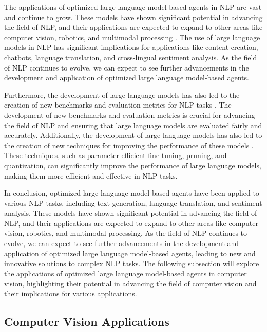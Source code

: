 \documentclass[11pt]{article}
\begin{document}
The applications of optimized large language model-based agents in NLP are vast and continue to grow. These models have shown significant potential in advancing the field of NLP, and their applications are expected to expand to other areas like computer vision, robotics, and multimodal processing \cite{ref227}. The use of large language models in NLP has significant implications for applications like content creation, chatbots, language translation, and cross-lingual sentiment analysis. As the field of NLP continues to evolve, we can expect to see further advancements in the development and application of optimized large language model-based agents.

Furthermore, the development of large language models has also led to the creation of new benchmarks and evaluation metrics for NLP tasks \cite{ref31}. The development of new benchmarks and evaluation metrics is crucial for advancing the field of NLP and ensuring that large language models are evaluated fairly and accurately. Additionally, the development of large language models has also led to the creation of new techniques for improving the performance of these models \cite{ref228}. These techniques, such as parameter-efficient fine-tuning, pruning, and quantization, can significantly improve the performance of large language models, making them more efficient and effective in NLP tasks.

In conclusion, optimized large language model-based agents have been applied to various NLP tasks, including text generation, language translation, and sentiment analysis. These models have shown significant potential in advancing the field of NLP, and their applications are expected to expand to other areas like computer vision, robotics, and multimodal processing. As the field of NLP continues to evolve, we can expect to see further advancements in the development and application of optimized large language model-based agents, leading to new and innovative solutions to complex NLP tasks. The following subsection will explore the applications of optimized large language model-based agents in computer vision, highlighting their potential in advancing the field of computer vision and their implications for various applications.

\subsection{Computer Vision Applications}
\end{document}
